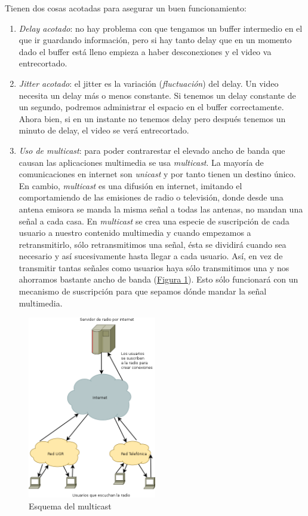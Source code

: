 \documentclass[10pt,a4paper,spanish]{report}
\begin{document}
Tienen dos cosas acotadas para asegurar un buen funcionamiento:
\begin{enumerate}[\color{tema2}{$\bigstar$}]
  \item \textcolor{tema2}{\textit{Delay acotado}}: no hay problema con que tengamos un buffer intermedio en el que ir guardando información, pero si hay tanto delay que en un momento dado el buffer está lleno empieza a haber desconexiones y el video va entrecortado.
  \item \textcolor{tema2}{\textit{Jitter acotado}}: el jitter es la variación (\textit{\textcolor{tema2}{fluctuación}}) del delay. Un video necesita un delay más o menos constante. Si tenemos un delay constante de un segundo, podremos administrar el espacio en el buffer correctamente. Ahora bien, si en un instante no tenemos delay pero después tenemos un minuto de delay, el video se verá entrecortado.
  \item \textcolor{tema2}{\textit{Uso de multicast}}: para poder contrarestar el elevado ancho de banda que causan las aplicaciones multimedia se usa \textcolor{tema2}{\textit{multicast}}. La mayoría de comunicaciones en internet son \textcolor{tema2}{\textit{unicast}} y por tanto tienen un destino único. En cambio, \textit{\textcolor{tema2}{multicast}} es una difusión en internet, imitando el comportamiendo de las emisiones de radio o televisión, donde desde una antena emisora se manda la misma señal a todas las antenas, no mandan una señal a cada casa. En \textcolor{tema2}{\textit{multicast}} se crea una especie de suscripción de cada usuario a nuestro contenido multimedia y cuando empezamos a retransmitirlo, sólo retransmitimos una señal, ésta se dividirá cuando sea necesario y así sucesivamente hasta llegar a cada usuario. Así, en vez de transmitir tantas señales como usuarios haya sólo transmitimos una y nos ahorramos bastante ancho de banda (\hyperref[multicast]{Figura \ref*{multicast}}). Esto sólo funcionará con un mecanismo de suscripción para que sepamos dónde mandar la señal multimedia.

\end{enumerate}

\begin{figure}[!h]
\centering
\includegraphics[width=0.5\textwidth]{multicast}
\caption{Esquema del multicast}
\label{multicast}
\end{figure}
\end{document}
